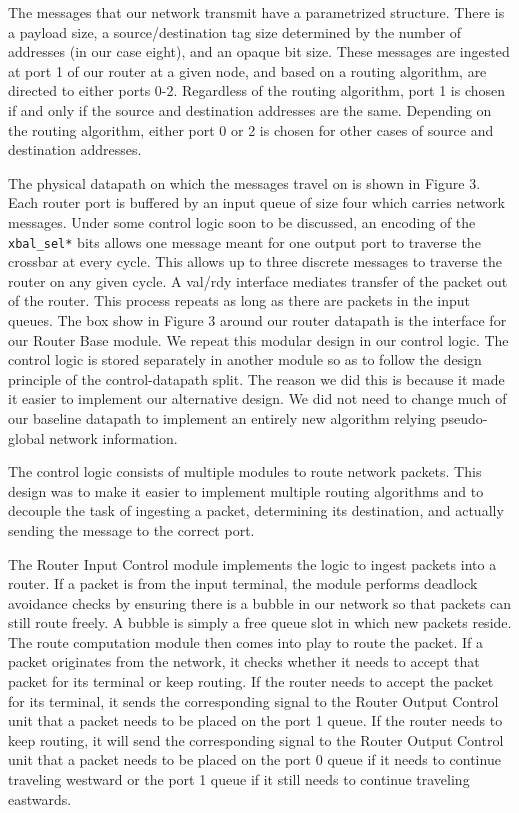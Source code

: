 \documentclass[10pt]{article}
\begin{document}
The messages that our network transmit have a parametrized structure.
There is a payload size, a source/destination tag size determined by the number
of addresses (in our case eight), and an opaque bit size.
These messages are ingested at port 1 of our router at a given node, and based
on a routing algorithm, are directed to either ports 0-2.
Regardless of the routing algorithm, port 1 is chosen if and only if 
the source and destination addresses are the same.
Depending on the routing algorithm, either port 0 or 2 is chosen for other
cases of source and destination addresses. \par

The physical datapath on which the messages travel on is shown in Figure 3.
Each router port is buffered by an input queue of size four which carries
network messages. 
Under some control logic soon to be discussed, an encoding of the 
\texttt{xbal\_sel*} bits allows one message meant for one output port to
traverse the crossbar at every cycle.
This allows up to three discrete messages to traverse the router on any 
given cycle.
A val/rdy interface mediates transfer of the packet out of the router. 
This process repeats as long as there are packets in the input queues.
The box show in Figure 3 around our router datapath is the interface for our 
Router Base module. 
We repeat this modular design in our control logic.
The control logic is stored separately in another module so as to follow the
design principle of the control-datapath split. 
The reason we did this is because it made it easier to implement our 
alternative design.
We did not need to change much of our baseline datapath to implement an 
entirely new algorithm relying pseudo-global network information. \par

The control logic consists of multiple modules to route network packets.
This design was to make it easier to implement multiple routing algorithms
and to decouple the task of ingesting a packet, determining its destination,
and actually sending the message to the correct port. \par
The Router Input Control module implements the logic to ingest packets into
a router. 
If a packet is from the input terminal, the module performs deadlock avoidance 
checks by ensuring there is a bubble in our network so that packets can still
route freely.
A bubble is simply a free queue slot in which new packets reside.
The route computation module then comes into play to route the packet.
If a packet originates from the network, it checks whether it needs to accept
that packet for its terminal or keep routing. 
If the router needs to accept the packet for its terminal, it sends the
corresponding signal to the Router Output Control unit that a packet needs to 
be placed on the port 1 queue. 
If the router needs to keep routing, it will send the corresponding signal to
the Router Output Control unit that a packet needs to be placed on the port 0
queue if it needs to continue traveling westward or the port 1 queue if it 
still needs to continue traveling eastwards. \par
\end{document}
